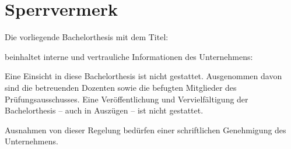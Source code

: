 \chapter*{Sperrvermerk}
\vspace*{0.7cm}

Die vorliegende Bachelorthesis mit dem Titel:
\vspace*{0.7cm}

\titel


\vspace*{0.7cm}
beinhaltet interne und vertrauliche Informationen des Unternehmens:
\vspace*{0.7cm}

\institutioneins

\vspace*{0.7cm}
Eine Einsicht in diese Bachelorthesis ist nicht gestattet. Ausgenommen davon sind die betreuenden Dozenten sowie die befugten Mitglieder des Prüfungsausschusses. Eine Veröffentlichung und Vervielfältigung der Bachelorthesis – auch in Auszügen – ist nicht gestattet.

\vspace*{0.7cm}

Ausnahmen von dieser Regelung bedürfen einer schriftlichen Genehmigung des Unternehmens.

\clearpage
\rohead{\textnormal{\headmark}}
